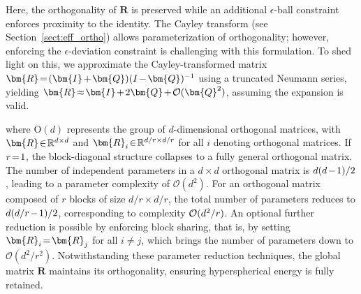 Here, the orthogonality of $\bm{R}$ is preserved while an additional $\epsilon$-ball constraint enforces proximity to the identity. The Cayley transform (see Section~\ref{sect:eff_ortho}) allows parameterization of orthogonality; however, enforcing the $\epsilon$-deviation constraint is challenging with this formulation. To shed light on this, we approximate the Cayley-transformed matrix $\thickmuskip=2mu \medmuskip=2mu \bm{R}=(\bm{I}+\bm{Q})(I-\bm{Q})^{-1}$ using a truncated Neumann series, yielding $\thickmuskip=2mu \medmuskip=2mu \bm{R}\approx\bm{I}+2\bm{Q}+\mathcal{O}(\bm{Q}^2)$, assuming the expansion is valid.

where $\text{O}(d)$ represents the group of $d$-dimensional orthogonal matrices, with $\thickmuskip=2mu \medmuskip=2mu \bm{R}\in\mathbb{R}^{d\times d}$ and $\thickmuskip=2mu \medmuskip=2mu \bm{R}_i\in\mathbb{R}^{d/r\times d/r}$ for all $i$ denoting orthogonal matrices. If $\thickmuskip=2mu \medmuskip=2mu r=1$, the block-diagonal structure collapses to a fully general orthogonal matrix. The number of independent parameters in a $d\times d$ orthogonal matrix is $\thickmuskip=2mu \medmuskip=2mu d(d-1)/2$, leading to a parameter complexity of $\mathcal{O}(d^2)$. For an orthogonal matrix composed of $r$ blocks of size $d/r \times d/r$, the total number of parameters reduces to $\thickmuskip=2mu \medmuskip=2mu d(d/r-1)/2$, corresponding to complexity $\thickmuskip=2mu \medmuskip=2mu \mathcal{O}(d^2/r)$. An optional further reduction is possible by enforcing block sharing, that is, by setting $\thickmuskip=2mu \medmuskip=2mu\bm{R}_i=\bm{R}_j$ for all $i\neq j$, which brings the number of parameters down to $\mathcal{O}(d^2/r^2)$. Notwithstanding these parameter reduction techniques, the global matrix $\bm{R}$ maintains its orthogonality, ensuring hyperspherical energy is fully retained.

